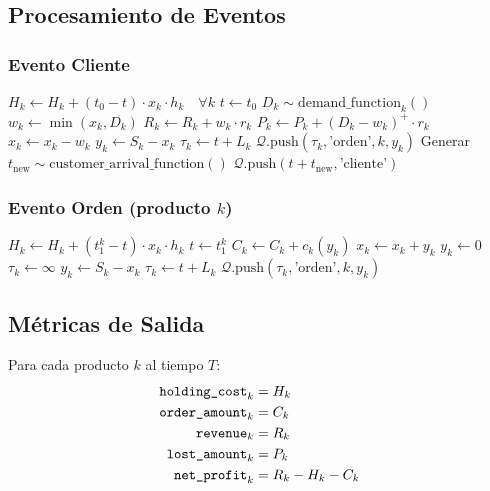 \documentclass{report}
\begin{document}
\subsection{Procesamiento de Eventos}

\subsubsection{Evento Cliente}
\begin{algorithmic}[1]
\State $H_k \gets H_k + (t_0 - t) \cdot x_k \cdot h_k \quad \forall k$ 
\State $t \gets t_0$
\State $D_k \sim \text{demand\_function}_k()$ 
\State $w_k \gets \min(x_k, D_k)$
\State $R_k \gets R_k + w_k \cdot r_k$ 
\State $P_k \gets P_k + (D_k - w_k)^+ \cdot r_k$ 
\State $x_k \gets x_k - w_k$
    \State $y_k \gets S_k - x_k$
    \State $\tau_k \gets t + L_k$
    \State $\mathcal{Q}.\text{push}(\tau_k, \text{'orden'}, k, y_k)$
\EndIf
{}
    \State Generar $t_{\text{new}} \sim \text{customer\_arrival\_function}()$
    \State $\mathcal{Q}.\text{push}(t + t_{\text{new}}, \text{'cliente'})$
\EndIf
\end{algorithmic}

\subsubsection{Evento Orden (producto $k$)}
\begin{algorithmic}[1]
\State $H_k \gets H_k + (t_1^k - t) \cdot x_k \cdot h_k$ 
\State $t \gets t_1^k$
\State $C_k \gets C_k + c_k(y_k)$ 
\State $x_k \gets x_k + y_k$
\State $y_k \gets 0$
\State $\tau_k \gets \infty$
 
    \State $y_k \gets S_k - x_k$
    \State $\tau_k \gets t + L_k$
    \State $\mathcal{Q}.\text{push}(\tau_k, \text{'orden'}, k, y_k)$
\EndIf
\end{algorithmic}

\subsection{Métricas de Salida}
Para cada producto $k$ al tiempo $T$:
\begin{align*}
\text{\texttt{holding\_cost}}_k &= H_k \\
\text{\texttt{order\_amount}}_k &= C_k \\
\text{\texttt{revenue}}_k &= R_k \\
\text{\texttt{lost\_amount}}_k &= P_k \\
\text{\texttt{net\_profit}}_k &= R_k - H_k - C_k
\end{align*}
\end{document}
